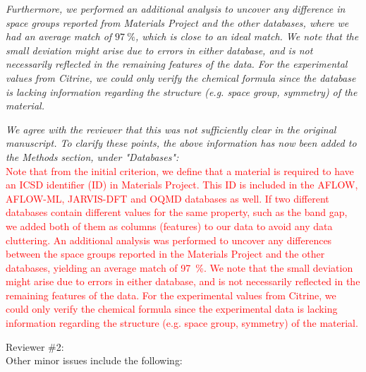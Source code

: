 \documentclass[11pt, a4paper]{letter} %
\newcommand{\mrk}[1]{\textcolor{red}{#1}}
\begin{document}

\textit{Furthermore, we performed an additional analysis to uncover any difference in space groups reported from Materials Project and the other databases, where we had an average match of $97 \ \%$, which is close to an ideal match. We note that the small deviation might arise due to errors in either database, and is not necessarily reflected in the remaining features of the data. For the experimental values from Citrine, we could only verify the chemical formula since the database is lacking information regarding the structure (e.g. space group, symmetry) of the material.}

\textit{We agree with the reviewer that this was not sufficiently clear in the original manuscript. To clarify these points, the above information has now been added to the Methods section, under "Databases": } \\ 
\mrk{Note that from the initial criterion, we define that a material is required to have an ICSD identifier (ID) in Materials Project. This ID is included in the AFLOW,  AFLOW-ML, JARVIS-DFT and OQMD databases as well. If two different databases contain different values for the same property, such as the band gap, we added both of them as columns (features) to our data to avoid any data cluttering. An additional analysis was performed to uncover any differences between the space groups reported in the Materials Project and the other databases, yielding an average match of \SI{97}{\percent}. We note that the small deviation might arise due to errors in either database, and is not necessarily reflected in the remaining features of the data. For the experimental values from Citrine, we could only verify the chemical formula since the experimental data is lacking information regarding the structure (e.g. space group, symmetry) of the material.} 

Reviewer \#2: \\
Other minor issues include the following: 
\end{document}
